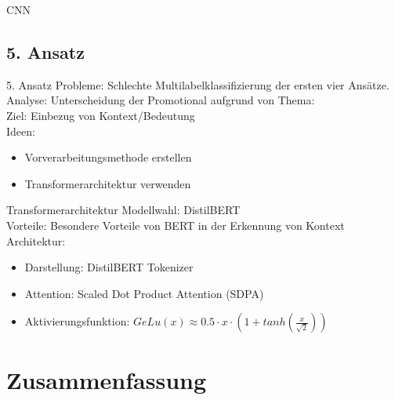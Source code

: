\documentclass[aspectratio=169]{beamer} %
\begin{document}
\begin{frame}{CNN}
    
\end{frame}

\subsection{5. Ansatz}

\begin{frame}
    \begin{block}{5. Ansatz}
        Probleme: Schlechte Multilabelklassifizierung der ersten vier Ansätze. \\
        Analyse: Unterscheidung der Promotional aufgrund von Thema: \\
        Ziel:
        Einbezug von Kontext/Bedeutung \\
        Ideen:
      \begin{itemize}
      \item Vorverarbeitungsmethode erstellen
      \item Transformerarchitektur verwenden
      \end{itemize}      
    \end{block}
\end{frame}

\begin{frame}
    \begin{block}{Transformerarchitektur}
     Modellwahl: DistilBERT \\
        Vorteile: Besondere Vorteile von BERT in der Erkennung von Kontext \\
        Architektur:
\begin{itemize}
	\item Darstellung: DistilBERT Tokenizer
     \item Attention: Scaled Dot Product Attention (SDPA)
            \item Aktivierungsfunktion: $GeLu(x) \approx {0.5 \cdot x \cdot (1+ tanh({\frac{x}{\sqrt{2}}}))} $
\end{itemize}        
    \end{block}
\end{frame}

\section{Zusammenfassung}
\end{document}
